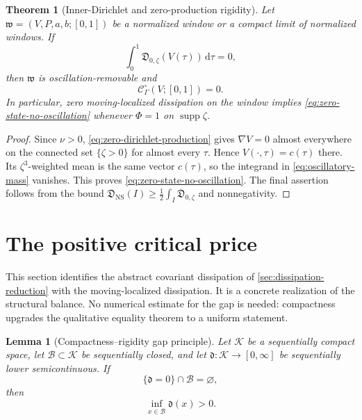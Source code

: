 \documentclass[11pt]{amsart}
\numberwithin{equation}{section}
\theoremstyle{plain}
\newtheorem{theorem}{Theorem}[section]
\newtheorem{lemma}[lemma]{Lemma}
\theoremstyle{definition}
\theoremstyle{remark}
\newcommand{\dd}{\,\mathrm d}
\newcommand{\supp}{\operatorname{supp}}
\newcommand{\ProductionNS}{\mathfrak D_{\mathrm{NS}}}
\newcommand{\OscMass}{\mathcal C^{\circ}}
\begin{document}
\begin{theorem}[Inner-Dirichlet and zero-production rigidity]
\label{thm:zero-production-rigidity}
Let \(\mathfrak w=(V,P,a,b;[0,1])\) be a normalized window or a compact
limit of normalized windows.  If
\begin{equation}\label{eq:zero-dirichlet-production}
 \int_0^1\mathfrak D_{0,\zeta}(V(\tau))\dd\tau=0,
\end{equation}
then \(\mathfrak w\) is oscillation-removable and
\begin{equation}\label{eq:zero-state-no-oscillation}
 \OscMass_\Gamma(V;[0,1])=0.
\end{equation}
In particular, zero moving-localized dissipation on the window implies
\eqref{eq:zero-state-no-oscillation} whenever \(\Phi=1\) on
\(\supp\zeta\).
\end{theorem}

\begin{proof}
Since \(\nu>0\), \eqref{eq:zero-dirichlet-production} gives
\(\nabla V=0\) almost everywhere
on the connected set \(\{\zeta>0\}\) for almost every \(\tau\).  Hence
\(V(\cdot,\tau)=c(\tau)\) there.  Its \(\zeta^3\)-weighted mean is
the same vector \(c(\tau)\), so the integrand in
\eqref{eq:oscillatory-mass} vanishes.  This proves
\eqref{eq:zero-state-no-oscillation}.  The final assertion follows from
the bound
\(\ProductionNS(I)\ge\frac12\int_I\mathfrak D_{0,\zeta}\) and
nonnegativity.
\end{proof}

\section{The positive critical price}
\label{sec:entropy-gap}

This section identifies the abstract covariant dissipation of
\cref{sec:dissipation-reduction} with the moving-localized dissipation.  It is
a concrete realization of the structural balance.  No numerical estimate for
the gap is needed: compactness upgrades the qualitative equality theorem to a
uniform statement.

\begin{lemma}[Compactness--rigidity gap principle]
\label{lem:abstract-gap-principle}
Let \(\mathcal K\) be a sequentially compact space, let
\(\mathcal B\subset\mathcal K\) be sequentially closed, and let
\(\mathfrak d:\mathcal K\to[0,\infty]\) be sequentially lower
semicontinuous.  If
\begin{equation}\label{eq:abstract-gap-separation}
 \{\mathfrak d=0\}\cap\mathcal B=\varnothing,
\end{equation}
then
\begin{equation}\label{eq:abstract-positive-gap}
 \inf_{x\in\mathcal B}\mathfrak d(x)>0.
\end{equation}
\end{lemma}
\end{document}
